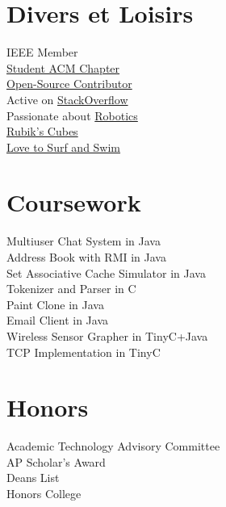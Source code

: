 \documentclass[10pt]{article}
\begin{document}
\begin{minipage}[t]{0.44\textwidth}
\section{Divers et Loisirs}
   IEEE Member\\
   \href{http://polaris.cs.wcu.edu/~acm/}{Student ACM Chapter}\\
   \href{https://github.com/ranman}{Open-Source Contributor}\\
   Active on \href{http://stackoverflow.com/users/240004/ranman}{StackOverflow}\\
   Passionate about \href{http://robotics.punahou.edu/}{Robotics}\\
   \href{http://www.youtube.com/user/ranman96734}{Rubik's Cubes}\\
   \href{http://www.punahouaquatics.org/Home.jsp?team=hipaq}{Love to Surf and Swim}\\

\section{Coursework}
   Multiuser Chat System in Java\\
   Address Book with RMI in Java\\
   Set Associative Cache Simulator in Java\\
   Tokenizer and Parser in C\\
   Paint Clone in Java\\
   Email Client in Java\\
   Wireless Sensor Grapher in TinyC+Java\\
   TCP Implementation in TinyC\\

\section{Honors}
   Academic Technology Advisory Committee\\
   AP Scholar's Award\\
   Deans List\\
   Honors College\\
\end{minipage} %
\end{document}
